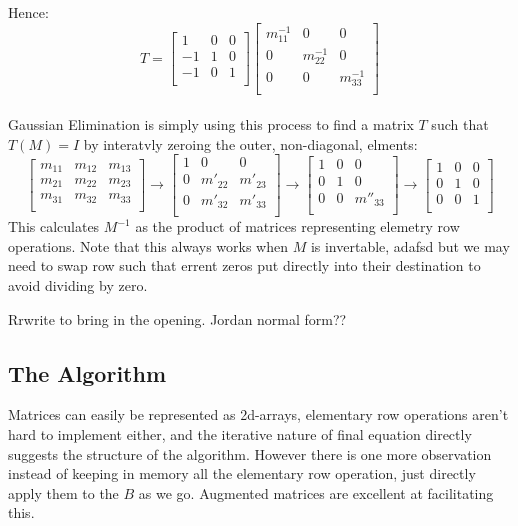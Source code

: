 Hence:
\[T =
\begin{bmatrix}
	1&0&0 \\
	-1&1&0 \\
	-1&0&1 \\
\end{bmatrix}
\begin{bmatrix}
	m_{11}^{-1}&0&0 \\
	0&m_{22}^{-1}&0 \\
	0&0&m_{33}^{-1} \\
\end{bmatrix}
\]
\\

Gaussian Elimination is simply using this process to find a matrix $T$ such that $T(M) = I$ by interatvly zeroing the outer, non-diagonal, elments:
\[
\begin{bmatrix}
	m_{11} & m_{12} & m_{13} \\
	m_{21} & m_{22} & m_{23} \\
	m_{31} & m_{32} & m_{33} \\
\end{bmatrix}
\rightarrow
\begin{bmatrix}
	1&0&0\\
	0 & m'_{22} & m'_{23} \\
	0 & m'_{32} & m'_{33} \\
\end{bmatrix}
\rightarrow
\begin{bmatrix}
	1&0&0\\
	0 & 1 & 0 \\
	0 & 0 & m''_{33} \\
\end{bmatrix}
\rightarrow
\begin{bmatrix}
	1&0&0\\
	0 & 1 & 0 \\
	0 & 0 & 1 \\
\end{bmatrix}
\]
This calculates $M^{-1}$ as the product of matrices representing elemetry row operations.
Note that this always works when $M$ is invertable, adafsd 
but we may need to swap row such that errent zeros put directly into their destination to avoid dividing by zero.

Rrwrite to bring in the opening.
Jordan normal form??

\subsection{The Algorithm}
Matrices can easily be represented as 2d-arrays,
elementary row operations aren't hard to implement either,
and the iterative nature of final equation directly suggests the structure of the algorithm.
However there is one more observation 
instead of keeping in memory all the elementary row operation, just directly apply them to the $B$ as we go.
Augmented matrices are excellent at facilitating this.

